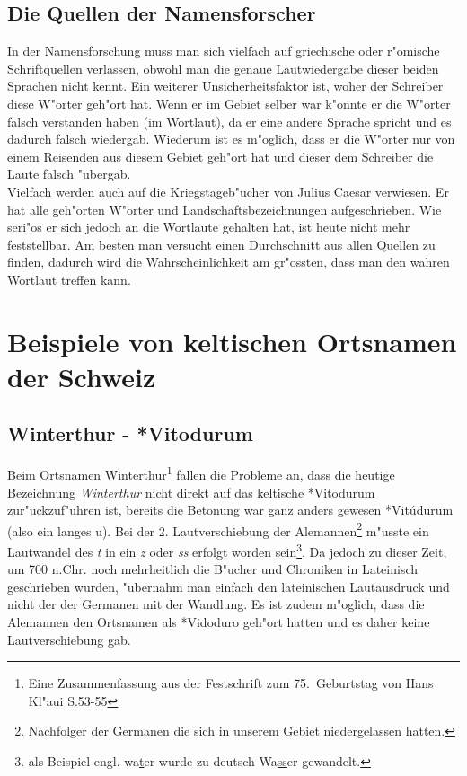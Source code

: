 \documentclass[10pt]{article}
\begin{document}
\subsection{Die Quellen der Namensforscher}
In der Namensforschung muss man sich vielfach auf griechische oder r"omische 
Schriftquellen verlassen, obwohl man die genaue Lautwiedergabe dieser beiden Sprachen
nicht kennt. Ein weiterer Unsicherheitsfaktor ist, woher der Schreiber
diese W"orter geh"ort hat. Wenn er im Gebiet selber war k"onnte er die W"orter falsch verstanden
haben (im Wortlaut), da er eine andere Sprache spricht und es dadurch falsch wiedergab.
Wiederum ist es m"oglich, dass er die W"orter nur von einem Reisenden
aus diesem Gebiet geh"ort hat und dieser dem Schreiber die Laute falsch "ubergab.\\
Vielfach werden auch auf die Kriegstageb"ucher von Julius Caesar verwiesen.
Er hat alle geh"orten W"orter und Landschaftsbezeichnungen aufgeschrieben.
Wie seri"os er sich jedoch an die Wortlaute gehalten hat, ist heute nicht
mehr feststellbar. Am besten man versucht einen Durchschnitt aus allen
Quellen zu finden, dadurch wird die Wahrscheinlichkeit am gr"ossten, dass
man den wahren Wortlaut treffen kann.

\section{Beispiele von keltischen Ortsnamen der Schweiz}
\subsection{Winterthur - *Vitodurum} \label{Winterthur}
Beim Ortsnamen Winterthur\footnote{Eine Zusammenfassung aus der Festschrift
zum 75.~Geburtstag von Hans Kl"aui \cite{WTH:KLAEUI} S.53-55} fallen die Probleme an,
dass die heutige Bezeichnung {\sl Winterthur} nicht direkt auf das keltische
*Vitodurum zur"uckzuf"uhren ist, bereits die Betonung war ganz anders gewesen
*Vit\'udurum (also ein langes u). Bei der 2. Lautverschiebung der
Alemannen\footnote{Nachfolger der Germanen die sich in unserem Gebiet
niedergelassen hatten.} m"usste ein Lautwandel des {\sl t} in ein {\sl z}
oder {\sl ss} erfolgt worden sein\footnote{als Beispiel engl.
wa\underline{t}er wurde zu deutsch Wa\underline{ss}er gewandelt.}.
Da jedoch zu dieser Zeit, um 700 n.Chr. noch mehrheitlich die B"ucher und
Chroniken in Lateinisch geschrieben wurden, "ubernahm man einfach den
lateinischen Lautausdruck und nicht der der Germanen mit der Wandlung.
Es ist zudem m"oglich, dass die Alemannen den Ortsnamen als *Vidoduro geh"ort
hatten und es daher keine Lautverschiebung gab.
\end{document}

